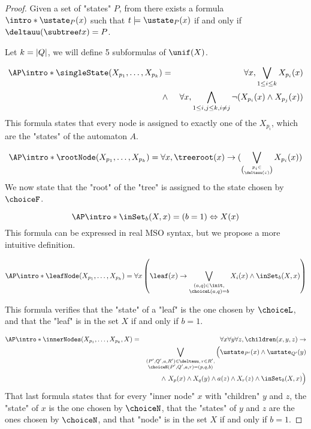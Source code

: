 \documentclass[a4paper,UKenglish,cleveref, autoref, thm-restate]{lipics-v2021}
\begin{document}
\begin{proof}
	\AP Given a set of "states" $P$, from  there exists a formula $\intro* \ustate_P(x)$ such that
	$t \models \ustate_P(x)$ if and only if  $\deltauu(\subtree t x) = P$.

	Let $k = \left|Q\right|$, we will define 5 subformulas of $\unif(X)$.

	\begin{eqnarray*}
		\AP \intro* \singleState (X_{p_1}, \ldots, X_{p_k})  &=& \forall x, \bigvee_{1 \leq i \leq k} X_{p_i} (x)\\
		&\land& \forall x, \bigwedge_{1 \leq i, j \leq k, i \neq j} \lnot(X_{p_i} (x) \land X_{p_j}(x))
	\end{eqnarray*}
    This formula states that every node is assigned to exactly one of the $X_{p_i}$, which are the "states" of the automaton $A$.

	\begin{equation*}
		\AP \intro*	\rootNode (X_{p_1}, \ldots, X_{p_k})  = \forall x, \treeroot(x) \ra (\bigvee_{p_i \in \choose \deltauu(\varepsilon)} X_{p_i}(x))
	\end{equation*}
    We now state that the "root" of the "tree" is assigned to the state chosen by $\choiceF$.

	\begin{equation*}
		\AP \intro* \inSet_b (X, x)  = (b = 1) \Leftrightarrow X(x)
	\end{equation*}
    This formula can be expressed in real MSO syntax, but we propose a more intuitive definition.

	\begin{equation*}
		\AP \intro* \leafNode (X_{p_1}, \ldots, X_{p_k})  = \forall x \left( \leaf(x) \rightarrow \bigvee_{\substack{(a, q) \in \init,\\ \choiceL(a,q) = b}} X_i(x) \land  \inSet_b (X,x)  \right)
	\end{equation*}
    
    This formula verifies that the "state" of a "leaf" is the one chosen by $\choiceL$, and that the "leaf" is in the set $X$ if and only if $b = 1$.

	\begin{eqnarray*}
	\AP \intro* \innerNodes (X_{p_1}, \ldots, X_{p_k}, X)  &=& \forall x \forall y \forall z, \children (x,y,z) \ra \\
		&& \bigvee_{ \substack{(P',Q',a,R')\in \deltauu, \, r \in R', \\ \choiceN(P',Q',a,r) = (p,q,b)}} \Big( \ustate_{P'}(x) \land \ustate_{Q'}(y) \\
		&& \qquad \land \  X_p(x) \land X_q(y) \land a(z) \land X_r(z) \land  \inSet_b(X,x)\Big)
	\end{eqnarray*}
    That last formula states that for every "inner node" $x$ with "children" $y$ and $z$, the "state" of $x$ is the one chosen by $\choiceN$,
    that the "states" of $y$ and $z$ are the ones chosen by $\choiceN$, and that "node" is in the set $X$ if and only if $b = 1$.



\end{proof}
\end{document}

